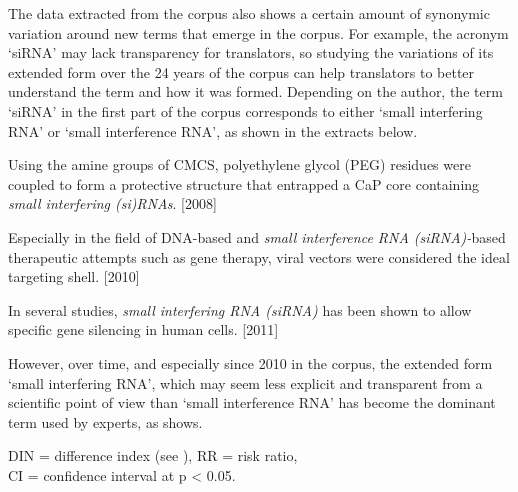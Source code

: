 \documentclass[output=paper]{langscibook}
\begin{document}
The data extracted from the corpus also shows a certain amount of synonymic variation around new terms that emerge in the corpus. For example, the acronym ‘siRNA’ may lack transparency for translators, so studying the variations of its extended form over the 24 years of the corpus can help translators to better understand the term and how it was formed. Depending on the author, the term ‘siRNA’ in the first part of the corpus corresponds to either ‘small interfering RNA’ or ‘small interference RNA’, as shown in the extracts below.

\ea%
    \label{ex:key:2}
         Using the amine groups of CMCS, polyethylene glycol (PEG) residues were coupled to form a protective structure that entrapped a CaP core containing \textit{small interfering (si)RNAs}. [2008]
\z

\ea%
    \label{ex:key:3}
         Especially in the field of DNA-based and \textit{small interference RNA (siRNA)-}based therapeutic attempts such as gene therapy, viral vectors were considered the ideal targeting shell. [2010]
\z

\ea%
    \label{ex:key:4}
         In several studies, \textit{small interfering RNA (siRNA)} has been shown to allow specific gene silencing in human cells. [2011]
\z

However, over time, and especially since 2010 in the corpus, the extended form ‘small interfering RNA’, which may seem less explicit and transparent from a scientific point of view than ‘small interference RNA’ has become the dominant term used by experts, as  shows.

\begin{table}
\caption{Changes in observed frequencies for the two variants ‘small-interference RNA’ and ‘small-interfering RNA’.}
{DIN = difference index (see \citealt{FidlerCvrček2015}), RR = risk ratio,\\ CI = confidence interval at p < 0.05.}
\label{tab:key:3}
\end{table}
\end{document}
